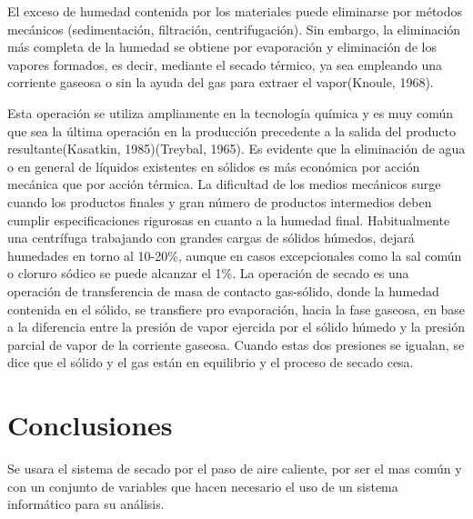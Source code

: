 El exceso de humedad contenida por los materiales puede eliminarse por métodos
mecánicos (sedimentación, filtración, centrifugación). Sin embargo, la
eliminación más completa de la humedad se obtiene por evaporación y eliminación
de los vapores formados, es decir, mediante el secado térmico, ya sea empleando
una corriente gaseosa o sin la ayuda del gas para extraer el vapor(Knoule, 1968).

Esta operación se utiliza ampliamente en la tecnología química y es muy común
que sea la última operación en la producción precedente a la salida del producto
resultante(Kasatkin, 1985)(Treybal, 1965). Es evidente que la eliminación de
agua o en general de líquidos existentes en sólidos es más económica por acción
mecánica que por acción térmica. La dificultad de los medios mecánicos surge
cuando los productos finales y gran número de productos intermedios deben
cumplir especificaciones rigurosas en cuanto a la humedad final. Habitualmente
una centrífuga trabajando con grandes cargas de sólidos húmedos, dejará
humedades en torno al 10-20\%, aunque en casos excepcionales como la sal común o
cloruro sódico se puede alcanzar el 1\%. La operación de secado es una operación
de transferencia de masa de contacto gas-sólido, donde la humedad contenida en
el sólido, se transfiere pro evaporación, hacia la fase gaseosa, en base a la
diferencia entre la presión de vapor ejercida por el sólido húmedo y la presión
parcial de vapor de la corriente gaseosa. Cuando estas dos presiones se igualan,
se dice que el sólido y el gas están en equilibrio y el proceso de secado cesa.



\section{Conclusiones}

Se usara el sistema de secado por el paso de aire caliente, por ser el mas común
y con un conjunto de variables que hacen necesario el uso de un sistema
informático para su análisis.

